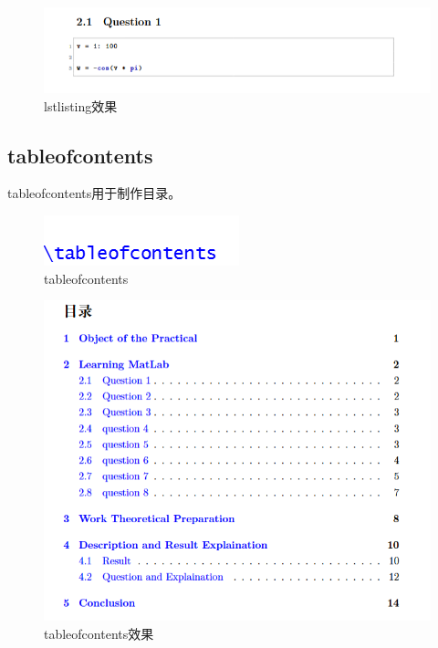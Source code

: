 \documentclass{article}
\begin{document}
\begin{figure}[H]
    \centering
    \includegraphics[width=1\linewidth]{lstlisting.png}
    \caption{lstlisting效果}
\end{figure}

\subsection{tableofcontents}
tableofcontents用于制作目录。
\begin{figure}[H]
    \centering
    \includegraphics[width=1\linewidth]{tableofcontents.png}
    \caption{tableofcontents}
\end{figure}
\begin{figure}[H]
    \centering
    \includegraphics[width=1\linewidth]{tableofcontents2.png}
    \caption{tableofcontents效果}
\end{figure}
\end{document}
